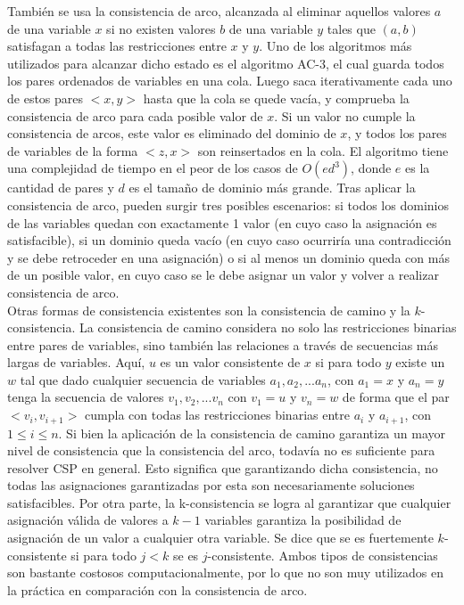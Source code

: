 \documentclass[12pt]{report}
\begin{document}
También se usa la consistencia de arco, alcanzada al eliminar aquellos valores $a$ de una variable $x$ si no existen valores $b$ de una variable $y$ tales que $(a,b)$ satisfagan a todas las restricciones entre $x$ y $y$. Uno de los algoritmos más utilizados para alcanzar dicho estado es el algoritmo AC-3, el cual guarda todos los pares ordenados de variables en una cola. Luego saca iterativamente cada uno de estos pares $<x,y>$ hasta que la cola se quede vacía, y comprueba la consistencia de arco para cada posible valor de $x$. Si un valor no cumple la consistencia de arcos, este valor es eliminado del dominio de $x$, y todos los pares de variables de la forma $<z,x>$ son reinsertados en la cola. El algoritmo tiene una complejidad de tiempo en el peor de los casos de $O(ed^3 )$, donde $e$ es la cantidad de pares y $d$ es el tamaño de dominio más grande. Tras aplicar la consistencia de arco, pueden surgir tres posibles escenarios: si todos los dominios de las variables quedan con exactamente 1 valor (en cuyo caso la asignación es satisfacible), si un dominio queda vacío (en cuyo caso ocurriría una contradicción y se debe retroceder en una asignación) o si al menos un dominio queda con más de un posible valor, en cuyo caso se le debe asignar un valor y volver a realizar consistencia de arco.\\

Otras formas de consistencia existentes son la consistencia de camino y la $k$-consistencia. La consistencia de camino considera no solo las restricciones binarias entre pares de variables, sino también las relaciones a través de secuencias más largas de variables. Aquí, $u$ es un valor consistente de $x$ si para todo $y$ existe un $w$ tal que dado cualquier secuencia de variables $a_1, a_2, ... a_n$, con $a_1=x$ y $a_n=y$ tenga la secuencia de valores $v_1, v_2, ... v_n$ con $v_1=u$ y $v_n=w$ de forma que el par $<v_i,v_{i+1}>$ cumpla con todas las restricciones binarias entre $a_i$ y $a_{i+1}$, con $1\leq  i \leq  n$. Si bien la aplicación de la consistencia de camino garantiza un mayor nivel de consistencia que la consistencia del arco, todavía no es suficiente para resolver CSP en general. Esto significa que garantizando dicha consistencia, no todas las asignaciones garantizadas por esta son necesariamente soluciones satisfacibles. Por otra parte, la k-consistencia se logra al garantizar que cualquier asignación válida de valores a $k-1$ variables garantiza la posibilidad de asignación de un valor a cualquier otra variable. Se dice que se es fuertemente $k$-consistente si para todo $j<k$ se es $j$-consistente. Ambos tipos de consistencias son bastante costosos computacionalmente, por lo que no son muy utilizados en la práctica en comparación con la consistencia de arco.\\
\end{document}
